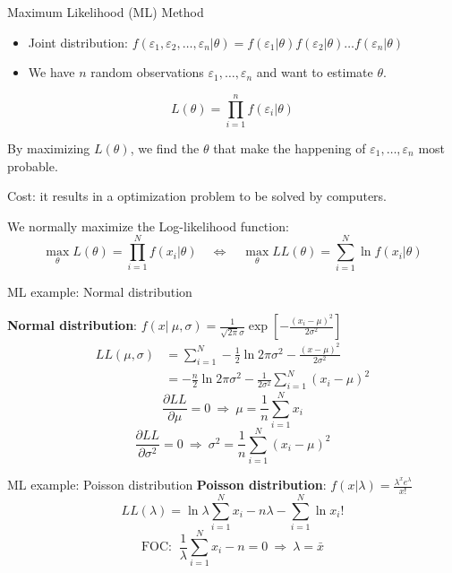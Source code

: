\documentclass{beamer}
\begin{document}
\begin{frame}{Maximum Likelihood (ML) Method}

\begin{itemize}
\item Joint distribution: $f(\varepsilon_1,\varepsilon_2,\dots,\varepsilon_n|\theta)=f(\varepsilon_1|\theta)f(\varepsilon_2|\theta)\dots f(\varepsilon_n|\theta)$
\item We have $n$ random observations $\varepsilon_1,\dots,\varepsilon_n$ and want to estimate $\theta$. 
\end{itemize}\medskip

 $$\displaystyle L(\theta)=\prod_{i=1}^n f(\varepsilon_i|\theta)$$

By maximizing $L(\theta)$, we find the $\theta$ that make the happening of $\varepsilon_1,\dots,\varepsilon_n$ most probable.\medskip

Cost: it results in a optimization problem to be solved by computers.\medskip

We normally maximize the Log-likelihood function:
\[ \max_\theta L(\theta)=\prod_{i=1}^N f(x_i|\theta) \quad 
\Leftrightarrow
\quad \max_\theta L\!L(\theta)=\sum_{i=1}^{N} \ln f(x_i|\theta) \]

\end{frame}

\begin{frame}{ML example: Normal distribution}

\textbf{Normal distribution}: $f(x|\ \mu,\sigma)=\frac{1}{\sqrt{2\pi}\sigma}\exp[-\frac{(x_i-\mu)^2}{2\sigma^2}] $
\begin{align*}
LL(\mu,\sigma)&=\sum_{i=1}^N -\frac{1}{2}\ln 2\pi\sigma^2-\frac{(x-\mu)^2}{2\sigma^2}\\
&=-\frac{n}{2}\ln 2\pi\sigma^2-\frac{1}{2\sigma^2}\sum_{i=1}^N(x_i-\mu)^2
\end{align*}
\[ \frac{\partial LL}{\partial \mu}=0 \ \Rightarrow \ \mu=\frac{1}{n}\sum_{i=1}^N x_i \]
\[\frac{\partial LL}{\partial \sigma^2}=0 \ \Rightarrow \ \sigma^2= \frac{1}{n}\sum_{i=1}^N (x_i-\mu)^2 \]
\end{frame}

\begin{frame}{ML example: Poisson distribution}
\textbf{Poisson distribution}: $\displaystyle f(x|\lambda)=\frac{\lambda^xe^{\lambda}}{x!} $
\[ LL(\lambda)=\ln\lambda\sum_{i=1}^N x_i - n\lambda-\sum_{i=1}^N\ln x_i! \]
\[\text{FOC: } \ \frac{1}{\lambda}\sum_{i=1}^Nx_i-n=0\ \Rightarrow \ \lambda=\bar{x}\]
\end{frame}
\end{document}
